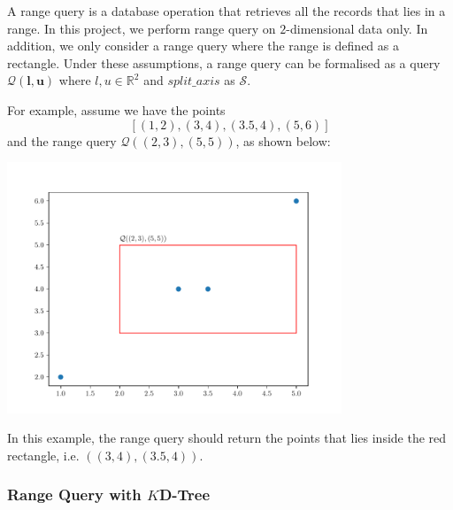 A range query is a database operation that retrieves all the records that lies in a range. In this project, we perform range query on $2$-dimensional data only. In addition, we only consider a range query where the range is defined as a rectangle. Under these assumptions, a range query can be formalised as a query $\mathcal{Q}(\boldsymbol{l}, \boldsymbol{u})$ where $l,u\in\mathbb{R}^2$ and $split\_axis$ as $\mathcal{S}$.

\begin{mscexample}
	For example, assume we have the points
	$$
	[(1,2), (3,4), (3.5, 4), (5,6)]
	$$
	and the range query $\mathcal{Q}((2,3), (5,5))$, as shown below:
	
	\begin{minipage}[t]{\linewidth}
	\centering
   	\includegraphics[width=10cm]{graphs/implementation/queries/range_query.pdf}
   	\label{fig:range_query_demo}
	\end{minipage}
	
In this example, the range query should return the points that lies inside the red rectangle, i.e. $((3,4), (3.5, 4))$.

\end{mscexample}

\subsubsection{Range Query with $K$D-Tree}


